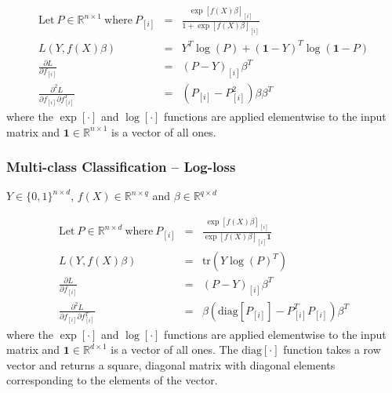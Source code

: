 \documentclass{article}
\begin{document}
\begin{eqnarray}
\mbox{Let} ~ P \in \mathbb{R}^{n \times 1} ~\mbox{where}~ P_{[i]} &=& \frac{\exp[f(X)\beta]_{[i]}}{1 + \exp[f(X)\beta]_{[i]}}  \nonumber \\
L(Y,f(X)\beta) & = & Y^T \log(P) + (\mathbf{1}-Y)^T \log(\mathbf{1}-P) \nonumber \\
\frac{\partial L}{\partial f_{[i]} } & = & (P - Y)_{[i]} \beta^T \nonumber \\
\frac{\partial^2 L}{\partial f_{[i]} \partial f_{[i]}^T} &=& \left(P_{[i]} - P_{[i]}^2\right) \beta \beta^T \nonumber
\end{eqnarray}
where the $\exp[ \cdot ]$ and $\log[\cdot]$ functions are applied elementwise to the input matrix and $\mathbf{1} \in \mathbb{R}^{n\times1}$ is a vector of all ones. 

\subsubsection{Multi-class Classification -- Log-loss}
$Y \in \{0,1\}^{n \times d}$, $f(X) \in \mathbb{R}^{n \times q}$ and $\beta \in \mathbb{R}^{q \times d}$

\begin{eqnarray}
\mbox{Let} ~ P \in \mathbb{R}^{n \times d} ~\mbox{where}~ P_{[i]} &=& \frac{\exp[f(X) \beta]_{[i]}}{\exp [f(X)\beta]_{[i]}  \mathbf{1}} \nonumber \\
L(Y,f(X)\beta) &=& \mbox{tr}(Y \log(P)^T)  \nonumber \\
\frac{\partial L}{\partial f_{[i]} }  & = & (P - Y)_{[i]} \beta^T \nonumber \\
\frac{\partial^2 L}{\partial f_{[i]} \partial f_{[i]}^T}  &=&
\beta \left( \mbox{diag}[P_{[i]}] - P_{[i]}^T P_{[i]} \right) \beta^T
\nonumber
\end{eqnarray}
where the $\exp[ \cdot ]$ and $\log[\cdot]$ functions are applied elementwise to the input matrix and $\mathbf{1} \in \mathbb{R}^{d\times1}$ is a vector of all ones.  The $\mbox{diag}[\cdot]$ function takes a row vector and returns a square, diagonal matrix with diagonal elements corresponding to the elements of the vector.
\end{document}
